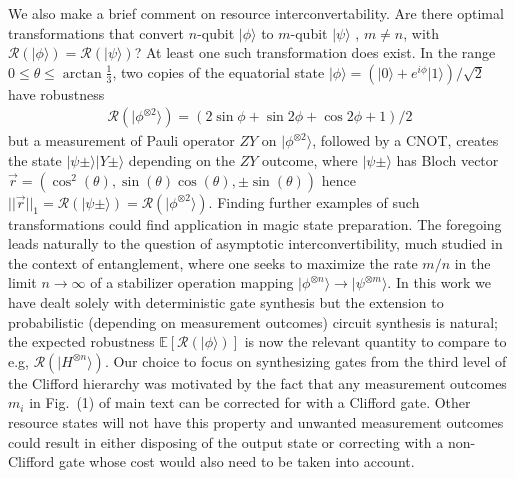 \documentclass[aps,prl,twocolumn,showpacs,superscriptaddress,groupedaddress,amsmath,amssymb]{revtex4-1}  %
\def\ket #1{\vert #1\rangle}
\begin{document}
We also make a brief comment on resource interconvertability. Are there optimal transformations that convert $n$-qubit $\ket{\phi}$ to $m$-qubit $\ket{\psi}$ ,  $m\neq n$, with $\mathcal{R}(\ket{\phi})=\mathcal{R}(\ket{\psi})$? At least one such transformation does exist. In the range $ 0 \leq \theta \leq \arctan \frac{1}{3}$, two copies of the equatorial state $\ket{\phi}=(\ket{0}+e^{i\phi}\ket{1})/\sqrt{2}$ have robustness 
\begin{align*}
\mathcal{R}(\ket{\phi^{\otimes 2}}) =(2 \sin \phi+\sin 2 \phi +\cos 2 \phi +1)/2
\end{align*}
but a measurement of Pauli operator $ZY$ on $\ket{\phi^{\otimes 2}}$, followed by a CNOT, creates the state $\ket{\psi\pm}\ket{Y\pm}$ depending on the $ZY$ outcome, where $ \ket{\psi\pm}$ has Bloch vector $\vec{r}=(\cos ^2(\theta ),\sin (\theta ) \cos ( \theta ),\pm \sin (\theta ))$ hence $||\vec{r}||_1=\mathcal{R}(\ket{\psi\pm})=\mathcal{R}(\ket{\phi^{\otimes 2}})$. Finding further examples of such transformations could find application in magic state preparation. The foregoing leads naturally to the question of asymptotic interconvertibility, much studied in the context of entanglement, where one seeks to maximize the rate $m/n$ in the limit $n\rightarrow \infty$ of a stabilizer operation mapping $\ket{\phi^{\otimes n}} \rightarrow \ket{\psi^{\otimes m}}$. In this work we have dealt solely with deterministic gate synthesis but the extension to probabilistic (depending on measurement outcomes) circuit synthesis is natural; the expected robustness $\mathbb{E}[\mathcal{R}(\ket{\phi})]$ is now the relevant quantity to compare to e.g, $\mathcal{R}(\ket{H^{\otimes n}})$. Our choice to focus on synthesizing gates from the third level of the Clifford hierarchy was motivated by the fact that any measurement outcomes $m_i$ in Fig.~(1) of main text can be corrected for with a Clifford gate. Other resource states will not have this property and unwanted measurement outcomes could result in either disposing of the output state or correcting with a non-Clifford gate whose cost would also need to be taken into account.



%
\end{document}
